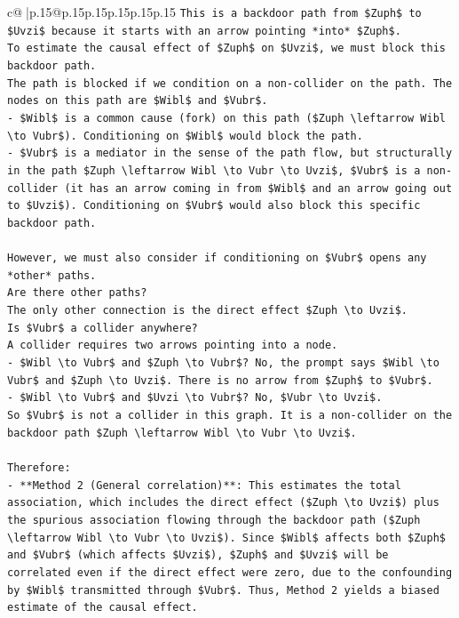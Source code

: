 \documentclass{article}
\begin{document}
{\begin{supertabular}{c@{$\;$}|p{.15\linewidth}@{}p{.15\linewidth}p{.15\linewidth}p{.15\linewidth}p{.15\linewidth}p{.15\linewidth}}
{{{\texttt{This is a backdoor path from \$Zuph\$ to \$Uvzi\$ because it starts with an arrow pointing *into* \$Zuph\$.} \\
\texttt{To estimate the causal effect of \$Zuph\$ on \$Uvzi\$, we must block this backdoor path.} \\
\texttt{The path is blocked if we condition on a non{-}collider on the path. The nodes on this path are \$Wibl\$ and \$Vubr\$.} \\
\texttt{{-} \$Wibl\$ is a common cause (fork) on this path (\$Zuph \textbackslash{}leftarrow Wibl \textbackslash{}to Vubr\$). Conditioning on \$Wibl\$ would block the path.} \\
\texttt{{-} \$Vubr\$ is a mediator in the sense of the path flow, but structurally in the path \$Zuph \textbackslash{}leftarrow Wibl \textbackslash{}to Vubr \textbackslash{}to Uvzi\$, \$Vubr\$ is a non{-}collider (it has an arrow coming in from \$Wibl\$ and an arrow going out to \$Uvzi\$). Conditioning on \$Vubr\$ would also block this specific backdoor path.} \\
\\ 
\texttt{However, we must also consider if conditioning on \$Vubr\$ opens any *other* paths.} \\
\texttt{Are there other paths?} \\
\texttt{The only other connection is the direct effect \$Zuph \textbackslash{}to Uvzi\$.} \\
\texttt{Is \$Vubr\$ a collider anywhere?} \\
\texttt{A collider requires two arrows pointing into a node.} \\
\texttt{{-} \$Wibl \textbackslash{}to Vubr\$ and \$Zuph \textbackslash{}to Vubr\$? No, the prompt says \$Wibl \textbackslash{}to Vubr\$ and \$Zuph \textbackslash{}to Uvzi\$. There is no arrow from \$Zuph\$ to \$Vubr\$.} \\
\texttt{{-} \$Wibl \textbackslash{}to Vubr\$ and \$Uvzi \textbackslash{}to Vubr\$? No, \$Vubr \textbackslash{}to Uvzi\$.} \\
\texttt{So \$Vubr\$ is not a collider in this graph. It is a non{-}collider on the backdoor path \$Zuph \textbackslash{}leftarrow Wibl \textbackslash{}to Vubr \textbackslash{}to Uvzi\$.} \\
\\ 
\texttt{Therefore:} \\
\texttt{{-} **Method 2 (General correlation)**: This estimates the total association, which includes the direct effect (\$Zuph \textbackslash{}to Uvzi\$) plus the spurious association flowing through the backdoor path (\$Zuph \textbackslash{}leftarrow Wibl \textbackslash{}to Vubr \textbackslash{}to Uvzi\$). Since \$Wibl\$ affects both \$Zuph\$ and \$Vubr\$ (which affects \$Uvzi\$), \$Zuph\$ and \$Uvzi\$ will be correlated even if the direct effect were zero, due to the confounding by \$Wibl\$ transmitted through \$Vubr\$. Thus, Method 2 yields a biased estimate of the causal effect.} \\
}}}
\end{supertabular}}
\end{document}
